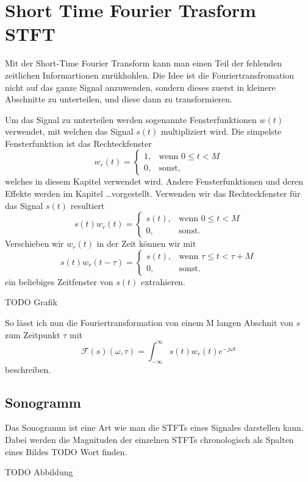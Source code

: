 %
%
%
%
\section{Short Time Fourier Trasform STFT\label{sonogramm:section:teil0}}
Mit der Short-Time Fourier Transform kann man einen Teil der fehlenden zeitlichen Informartionen zurükhohlen.
Die Idee ist die Fouriertransfromation nicht auf das ganze Signal anzuwenden, sondern dieses zuerst in kleinere
Abschnitte zu unterteilen, und diese dann zu transformieren.

Um das Signal zu unterteilen werden sogenannte Fensterfunktionen $w(t)$ verwendet, mit welchen das Signal
$s(t)$ multipliziert wird.
Die simpelste Fensterfunktion ist das Rechteckfenster
\begin{equation}
    w_r(t) = 
        \begin{cases}
        1,& \text{wenn } 0 \le t < M\\
        0, & \text{sonst, }
        \end{cases}
\end{equation}
welches in diesem Kapitel verwendet wird.
Andere Fensterfunktionen und deren Effekte werden im Kapitel \dots vorgestellt.
Verwenden wir das Rechteckfenster für das Signal $s(t)$ resultiert 
\begin{equation}
    s(t) w_r(t) = 
    \begin{cases}
    s(t),& \text{wenn } 0 \le t < M\\
    0, & \text{sonst.}
    \end{cases}
\end{equation}
Verschieben wir $w_r(t)$ in der Zeit können wir mit 
\begin{equation}
    s(t) w_r(t-\tau) = 
    \begin{cases}
        s(t),& \text{wenn } \tau \le t < \tau + M\\
        0, & \text{sonst.}
    \end{cases}
\end{equation}
ein beliebiges Zeitfenster von $s(t)$ extrahieren.

TODO Grafik

So lässt ich nun die Fouriertransformation von einem M langen Abschnit
von $s$ zum Zeitpunkt $\tau$ mit
\begin{equation}
    \mathscr{F}(s)(\omega, \tau) = \int_{-\infty}^{\infty} s(t) w_r(t) e^{-j \omega t}
\end{equation}
beschreiben.

\subsection{Sonogramm}

Das Sonogramm ist eine Art wie man die STFTs eines Signales darstellen kann.
Dabei werden die Magnituden der einzelnen STFTs chronologisch
als Spalten eines Bildes TODO Wort finden.

TODO Abbildung
